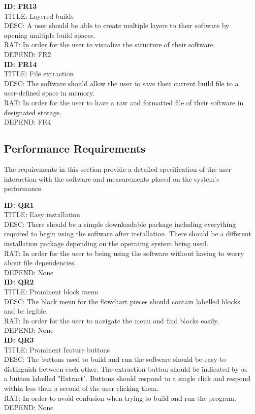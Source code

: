 \documentclass[journal,10pt,onecolumn,compsoc]{IEEEtran} \usepackage[margin=1.0in]{geometry} \usepackage{pdfpages} \usepackage{graphicx}
\begin{document}
\noindent
\textbf{ID: FR13}\\
TITLE: Layered builds\\
DESC: A user should be able to create multiple layers to their software by opening multiple build spaces.\\
RAT: In order for the user to visualize the structure of their software.\\
DEPEND: FR2\\

\noindent
\textbf{ID: FR14}\\
TITLE: File extraction\\
DESC: The software should allow the user to save their current build file to a user-defined space in memory.\\
RAT: In order for the user to have a raw and formatted file of their software in designated storage.\\
DEPEND: FR4\\


\subsection{Performance Requirements}

The requirements in this section provide a detailed specification of the user interaction with the software and measurements placed on the system's performance.

\noindent
\textbf{ID: QR1}\\
TITLE: Easy installation\\
DESC: There should be a simple downloadable package including everything required to begin using the software after installation.
There should be a different installation package depending on the operating system being used.\\
RAT: In order for the user to being using the software without having to worry about file dependencies.\\
DEPEND: None\\

\noindent
\textbf{ID: QR2}\\
TITLE: Prominent block menu\\
DESC: The block menu for the flowchart pieces should contain labelled blocks and be legible.\\
RAT: In order for the user to navigate the menu and find blocks easily.\\
DEPEND: None\\

\noindent
\textbf{ID: QR3}\\
TITLE: Prominent feature buttons\\
DESC: The buttons used to build and run the software should be easy to distinguish between each other. 
The extraction button should be indicated by as a button labelled "Extract".
Buttons should respond to a single click and respond within less than a second of the user clicking them.\\
RAT: In order to avoid confusion when trying to build and run the program.\\
DEPEND: None\\
\end{document}
